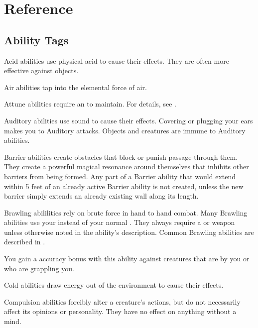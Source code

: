 \chapter{Reference}\label{Reference}

\section{Ability Tags}\label{Ability Tags}

   Acid abilities use physical acid to cause their effects.
  They are often more effective against objects.

   Air abilities tap into the elemental force of air.

   Attune abilities require an  to maintain.
  For details, see .

   Auditory abilities use sound to cause their effects.
  Covering or plugging your ears makes you \impervious to Auditory attacks.
  Objects and \deafened creatures are immune to Auditory abilities.

   Barrier abilities create obstacles that block or punish passage through them.
  They create a powerful magical resonance around themselves that inhibits other barriers from being formed.
  Any part of a Barrier ability that would extend within 5 feet of an already active Barrier ability is not created, unless the new barrier simply extends an already existing wall along its length.

   Brawling abililities rely on brute force in hand to hand combat.
  Many Brawling abilities use your  instead of your normal .
  They always require a  or  weapon unless otherwise noted in the ability's description.
  Common Brawling abilities are described in .

   You gain a  accuracy bonus with this ability against creatures that are \grappled by you or who are grappling you.

   Cold abilities draw energy out of the environment to cause their effects.

   Compulsion abilities forcibly alter a creature's actions, but do not necessarily affect its opinions or personality.
  They have no effect on anything without a mind.

